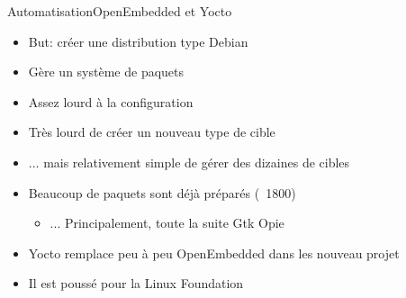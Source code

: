 \begin{frame}[fragile=singleslide]{Automatisation}{OpenEmbedded et Yocto}
  \begin{itemize}
  \item But: créer une distribution type Debian
  \item Gère un système de paquets
  \item Assez lourd à la configuration
  \item Très lourd de créer un nouveau type de cible
  \item ... mais relativement simple de gérer des dizaines de cibles
  \item Beaucoup de paquets sont déjà préparés (~1800)
    \begin{itemize}
    \item ... Principalement, toute la suite Gtk Opie
    \end{itemize}
  \item Yocto remplace peu à peu OpenEmbedded dans les nouveau projet
  \item Il est poussé pour la Linux Foundation

  \end{itemize}
\end{frame}

